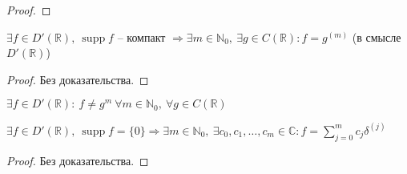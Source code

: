 \begin{enumerate}
\begin{lemma}
\begin{proof}
            \end{proof}
        \end{lemma}
        \begin{theorem}
            $\exists f \in D'(\mathbb{R}), \ \operatorname{supp} f$ -- компакт $\Rightarrow \exists m \in \mathbb{N}_0, \ \exists g \in C(\mathbb{R}): f = g^{(m)}$ (в смысле $D'(\mathbb{R})$)
            \begin{proof}
                Без доказательства.
            \end{proof}
        \end{theorem}
        \begin{exercise}
            $\exists f \in D'(\mathbb{R}): \ f \neq g^{m} \ \forall m \in \mathbb{N}_0, \ \forall g \in C(\mathbb{R})$
        \end{exercise}
        \begin{theorem}
            $\exists f \in D'(\mathbb{R}), \ \operatorname{supp} f = \{0\} \Rightarrow \exists m \in \mathbb{N}_0, \ \exists c_0, c_1, \dots, c_m \in \mathbb{C}: f = \sum\limits_{j =0}^m c_j \delta^{(j)}$
            \begin{proof}
                Без доказательства.
            \end{proof}
        \end{theorem}
\end{enumerate}
